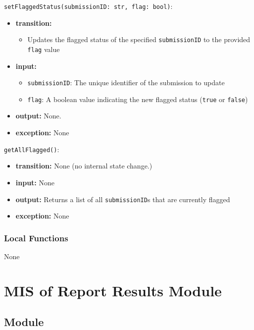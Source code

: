\documentclass[12pt, titlepage]{article}
\begin{document}
\begin{itemize}
\noindent \texttt{setFlaggedStatus(submissionID: str, flag: bool)}:
\begin{itemize}
    \item \textbf{transition:}
    \begin{itemize}
        \item Updates the flagged status of the specified \texttt{submissionID} to the provided \texttt{flag} value
    \end{itemize}
     \item \textbf{input:} 
    \begin{itemize}
        \item \texttt{submissionID}: The unique identifier of the submission to update
        \item \texttt{flag}: A boolean value indicating the new flagged status (\texttt{true} or \texttt{false})
    \end{itemize}
    \item \textbf{output:} None.
    \item \textbf{exception:} None
\end{itemize}

\noindent \texttt{getAllFlagged()}:
\begin{itemize}
    \item \textbf{transition:} None (no internal state change.)
    \item \textbf{input:} None
    \item \textbf{output:} Returns a list of all \texttt{submissionID}s that are currently flagged
    \item \textbf{exception:} None
\end{itemize}

\subsubsection{Local Functions}
\begin{itemize}
    None
\end{itemize}


\section{MIS of Report Results Module} \label{mResults}

\subsection{Module}


\end{itemize}
\end{document}
